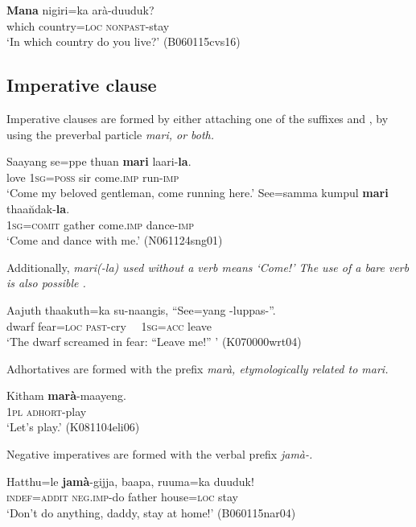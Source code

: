 \ea\label{ex:cl:interr:wh:initial1}
\gll \textbf{Mana} nigiri=ka arà-duuduk? \\
 which country=\textsc{loc} \textsc{nonpast}-stay\\
`In which country do you live?' (B060115cvs16)
\z



\subsection{Imperative clause}
Imperative clauses are formed by either attaching one of the suffixes  and , by using the preverbal particle \em mari\em, or both. 



\ea \label{ex:form:affix:la:double}
    \ea
	\gll Saayang se=ppe thuan \textbf{mari} laari-\textbf{la}. \\
	    love 1\textsc{sg}=\textsc{poss} sir come.\textsc{imp} run-\textsc{imp} \\
	    `Come my beloved gentleman, come running here.'
    \ex
	\gll See=samma kumpul \textbf{mari} thaa\u ndak-\textbf{la}. \\
	    1\textsc{sg}=\textsc{comit} gather come.\textsc{imp} dance-\textsc{imp}  \\
	    `Come and dance with me.' (N061124sng01)
    \z
\z


Additionally, \em mari(-la) \em used without a verb means `Come!' The use of a bare verb is also possible .
 
\ea\label{ex:imp:bare}
\gll Aajuth thaakuth=ka su-naangis, ``See=yang \zero-luppas-\zero''. \\ %
     dwarf fear=\textsc{loc} \textsc{past}-cry ~~1\textsc{sg}=\textsc{acc} leave  \\
    `The dwarf screamed in fear: ``Leave me!'' '  (K070000wrt04)
\z 

Adhortatives are formed with the prefix \em marà\em, etymologically related to \em mari\em.

\ea
\gll Kitham \textbf{marà}-maayeng. \\
     1\textsc{pl} \textsc{adhort}-play  \\
    `Let's play.' (K081104eli06)
\z


Negative imperatives are formed with the verbal prefix \em jamà-\em.

\ea
\gll Hatthu=le \textbf{jamà}-gijja, baapa, ruuma=ka duuduk! \\ %
      \textsc{indef}=\textsc{addit} \textsc{neg.imp}-do father house=\textsc{loc} stay \\
    `Don't do anything, daddy, stay at home!'  (B060115nar04)
\z     


